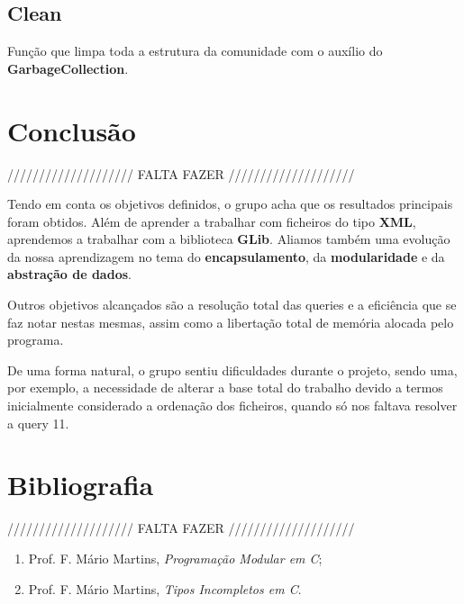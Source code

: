 \documentclass[a4paper]{article}
\begin{document}
\subsection{Clean}

Função que limpa toda a estrutura da comunidade com o auxílio do 
\textbf{GarbageCollection}.

\section{Conclusão}
\label{sec:conclusao}

//////////////////// FALTA FAZER ////////////////////

Tendo em conta os objetivos definidos, o grupo acha que os resultados 
principais foram obtidos. Além de aprender a trabalhar com ficheiros 
do tipo \textbf{XML}, aprendemos a trabalhar com a biblioteca \textbf{GLib}.
Aliamos também uma evolução da nossa aprendizagem no tema do 
\textbf{encapsulamento}, da \textbf{modularidade} e 
da \textbf{abstração de dados}.

Outros objetivos alcançados são a resolução total das queries e a eficiência
que se faz notar nestas mesmas, assim como a libertação total de memória 
alocada pelo programa.

De uma forma natural, o grupo sentiu dificuldades durante o projeto, sendo 
uma, por exemplo, a necessidade de alterar a base total do trabalho devido
a termos inicialmente considerado a ordenação dos ficheiros, quando só nos
faltava resolver a query 11.

\section{Bibliografia}

//////////////////// FALTA FAZER ////////////////////

\begin{enumerate} 
	\item Prof. F. Mário Martins, \textit{Programação Modular em C};
	\item Prof. F. Mário Martins, \textit{Tipos Incompletos em C}.
\end{enumerate}
\end{document}
